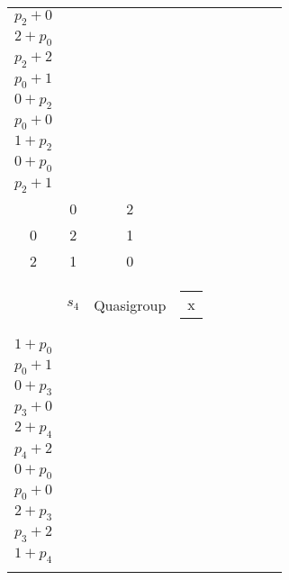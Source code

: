 \begin{longtable}{|c|c|c|c|c|c|c|c|c|}
\begin{tabular}{c}
    \( 1 + p_{0} \)\\\hline
    \( p_{2} + 0 \)
\end{tabular} & \begin{tabular}{c}
    x\\\hline
    \( 2 + p_{0} \)\\\hline
    \( p_{2} + 2 \)
\end{tabular} & \begin{tabular}{c}
    \\\hline
    \( p_{0} + 1 \)\\\hline
    \( 0 + p_{2} \)
\end{tabular} & \begin{tabular}{c}
    \\\hline
    \( p_{0} + 0 \)\\\hline
    \( 1 + p_{2} \)
\end{tabular} & \begin{tabular}{c}
    \\\hline
    \( 0 + p_{0} \)\\\hline
    \( p_{2} + 1 \)
\end{tabular}\\\hline
    \( \begin{smallmatrix}
    1 & 0 & 2\\
    0 & 2 & 1\\
    2 & 1 & 0\\
\end{smallmatrix} \) & \( s_{4} \) & Quasigroup & \begin{tabular}{c}
    x
\end{tabular} & \begin{tabular}{c}
    \\\hline
    \( 1 + p_{0} \)\\\hline
    \( p_{0} + 1 \)\\\hline
    \( 0 + p_{3} \)\\\hline
    \( p_{3} + 0 \)\\\hline
    \( 2 + p_{4} \)\\\hline
    \( p_{4} + 2 \)
\end{tabular} & \begin{tabular}{c}
    \\\hline
    \( 0 + p_{0} \)\\\hline
    \( p_{0} + 0 \)\\\hline
    \( 2 + p_{3} \)\\\hline
    \( p_{3} + 2 \)\\\hline
    \( 1 + p_{4} \)\\\hline

\end{tabular}
\end{longtable}
